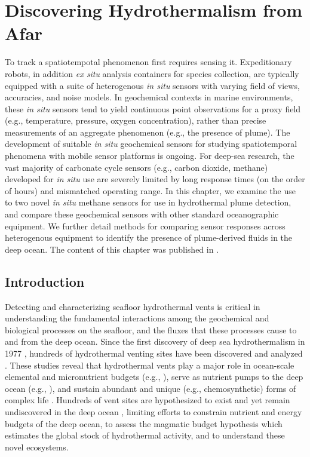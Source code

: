 \chapter{Discovering Hydrothermalism from Afar}
 To track a spatiotempotal phenomenon first requires sensing it. Expeditionary robots, in addition \emph{ex situ} analysis containers for species collection, are typically equipped with a suite of heterogenous \emph{in situ} sensors with varying field of views, accuracies, and noise models. In geochemical contexts in marine environments, these \emph{in situ} sensors tend to yield continuous point observations for a proxy field (e.g., temperature, pressure, oxygen concentration), rather than precise measurements of an aggregate phenomenon (e.g., the presence of plume). The development of suitable \emph{in situ} geochemical sensors for studying spatiotemporal phenomena with mobile sensor platforms is ongoing. For deep-sea research, the vast majority of carbonate cycle sensors (e.g., carbon dioxide, methane) developed for \emph{in situ} use are severely limited by long response times (on the order of hours) and mismatched operating range. In this chapter, we examine the use to two novel \emph{in situ} methane sensors for use in hydrothermal plume detection, and compare these geochemical sensors with other standard oceanographic equipment. We further detail methods for comparing sensor responses across heterogenous equipment to identify the presence of plume-derived fluids in the deep ocean. The content of this chapter was published in \cite{preston2022discovering}.

\section{Introduction}
Detecting and characterizing seafloor hydrothermal vents is critical in understanding the fundamental interactions among the geochemical and biological processes on the seafloor, and the fluxes that these processes cause to and from the deep ocean. Since the first discovery of deep sea hydrothermalism in 1977 \cite{corliss1979submarine}, hundreds of hydrothermal venting sites have been discovered and analyzed \cite{beaulieu2015undiscovered}. These studies reveal that hydrothermal vents play a major role in ocean-scale elemental and micronutrient budgets (e.g., \cite{le2019hydrothermal,resing2015basin}), serve as nutrient pumps to the deep ocean (e.g., \cite{dick2013microbiology, vic2018dispersion, scholz2019shelf, bell2017hydrothermal}), and sustain abundant and unique (e.g., chemosynthetic) forms of complex life \cite{grassle1987ecology, georgieva2021history}. Hundreds of vent sites are hypothesized to exist and yet remain undiscovered in the deep ocean \cite{beaulieu2015undiscovered}, limiting efforts to constrain nutrient and energy budgets of the deep ocean, to assess the magmatic budget hypothesis which estimates the global stock of hydrothermal activity, and to understand these novel ecosystems.  


